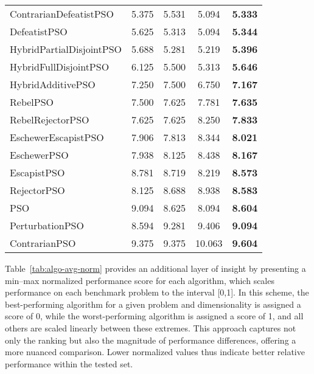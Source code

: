 {\begin{longtable}[c]{p{5cm}cccc}
ContrarianDefeatistPSO   & 5.375 & 5.531 & 5.094 & \textbf{5.333} \\
DefeatistPSO             & 5.625 & 5.313 & 5.094 & \textbf{5.344} \\
HybridPartialDisjointPSO & 5.688 & 5.281 & 5.219 & \textbf{5.396} \\
HybridFullDisjointPSO    & 6.125 & 5.500 & 5.313 & \textbf{5.646} \\
HybridAdditivePSO        & 7.250 & 7.500 & 6.750 & \textbf{7.167} \\
RebelPSO                 & 7.500 & 7.625 & 7.781 & \textbf{7.635} \\
RebelRejectorPSO         & 7.625 & 7.625 & 8.250 & \textbf{7.833} \\
EschewerEscapistPSO      & 7.906 & 7.813 & 8.344 & \textbf{8.021} \\
EschewerPSO              & 7.938 & 8.125 & 8.438 & \textbf{8.167} \\
EscapistPSO              & 8.781 & 8.719 & 8.219 & \textbf{8.573} \\
RejectorPSO              & 8.125 & 8.688 & 8.938 & \textbf{8.583} \\
PSO                      & 9.094 & 8.625 & 8.094 & \textbf{8.604} \\
PerturbationPSO          & 8.594 & 9.281 & 9.406 & \textbf{9.094} \\
ContrarianPSO            & 9.375 & 9.375 & 10.063 & \textbf{9.604} \\
\end{longtable}

Table~\ref{tab:algo-avg-norm} provides an additional layer of insight by presenting a min–max normalized performance score for each algorithm, which scales performance on each benchmark problem to the interval [0,1]. In this scheme, the best-performing algorithm for a given problem and dimensionality is assigned a score of 0, while the worst-performing algorithm is assigned a score of 1, and all others are scaled linearly between these extremes. This approach captures not only the ranking but also the magnitude of performance differences, offering a more nuanced comparison. Lower normalized values thus indicate better relative performance within the tested set.


}
